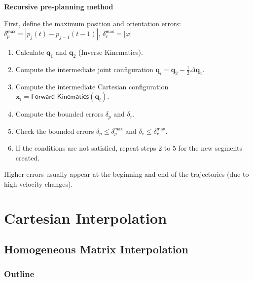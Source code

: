 \documentclass[10pt, aspectratio=169]{beamer}
\theoremstyle{remark}
\theoremstyle{definition}
\begin{document}
\begin{frame}[allowframebreaks]
    \framebreak

    \textbf{\textcolor{uma_blue_dark}{Recursive pre-planning method}}

    First, define the maximum position and orientation errors:
    $
    \delta_p^{\textsf{max}} = |p_j(t)-p_{j-1}(t-1)|, \, \delta_r^{\textsf{max}} = |\varphi|
    $
    \begin{enumerate}
        \item Calculate $\mathbf{q}_1$ and $\mathbf{q}_2$ (Inverse Kinematics).
        \item Compute the intermediate joint configuration $\mathbf{q}_i = \mathbf{q}_2-\frac{1}{2}\Delta\mathbf{q}_1$.
        \item Compute the intermediate Cartesian configuration $\mathbf{x}_i = \textsf{Forward Kinematics}(\mathbf{q}_i)$.
        \item Compute the bounded errors $\delta_p$ and $\delta_r$.
        \item Check the bounded errors $\delta_p \leq \delta_p^{\textsf{max}} $ and $\delta_r \leq \delta_r^{\textsf{max}}$.
        \item If the conditions are not satisfied, repeat steps 2 to 5 for the new segments created.
    \end{enumerate}

    Higher errors usually appear at the beginning and end of the trajectories (due to high velocity changes).
    


\end{frame}

\section{Cartesian Interpolation}
\subsection{Homogeneous Matrix Interpolation}
\begin{frame}
	\frametitle{Outline} %
\end{frame}
\end{document}
